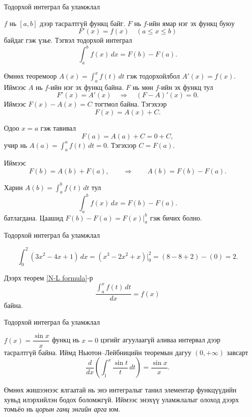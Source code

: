 \begin{frame}[allowframebreaks]{Тодорхой интеграл ба уламжлал}
\begin{theorem}\label{N-L formula}
$f$ нь $[a,b]$ дээр тасралтгүй функц байг. $F$ нь $f$-ийн ямар нэг эх функц буюу
\[
F'(x)=f(x)
\quad(a\le x\le b)
\]
байдаг гэж үзье. Тэгвэл тодорхой интеграл
\[
\int_a^b f(x)\,dx = F(b)-F(a).
\]
\end{theorem}

\begin{prof}
Өмнөх теоремоор $\displaystyle A(x)=\int_a^x f(t)\,dt$ гэж тодорхойлбол $A'(x)=f(x)$.
Иймээс $A$ нь $f$-ийн нэг эх функц байна. $F$ нь мөн $f$-ийн эх функц тул 
\[
F'(x)=A'(x)
\quad\Rightarrow\quad
(F-A)'(x)=0.
\]
Иймээс $F(x)-A(x)=C$ тогтмол байна. Тэгэхээр
\[
F(x)=A(x)+C.
\]

Одоо $x=a$ гэж тавивал
\[
F(a)=A(a)+C = 0 + C,
\]
учир нь $A(a)=\displaystyle\int_a^a f(t)\,dt =0$. Тэгэхээр $C=F(a)$.

Иймээс
\[
F(b)=A(b)+F(a),
\qquad\Rightarrow\qquad
A(b)=F(b)-F(a).
\]

Харин $A(b)=\displaystyle\int_a^b f(t)\,dt$ тул 
\[
\int_a^b f(x)\,dx = F(b)-F(a).
\] батлагдана. Цаашид $F(b)-F(a)=F(x)\Big|_a^b$ гэж бичих болно.
\end{prof}
\end{frame}

\begin{frame}[allowframebreaks]{Тодорхой интеграл ба уламжлал}
\begin{example}
\[
\int_0^2 (3x^2-4x+1)\,dx
=
\left(x^3-2x^2+x\right)\Big|_0^2
= (8-8+2)-(0)=2.
\]
\end{example}
Дээрх теорем \ref{N-L formula}-р $$\dfrac{\displaystyle\int_a^x f(t)\,dt}{dx}=f(x)$$ байна. 
\end{frame}

\begin{frame}[allowframebreaks]{Тодорхой интеграл ба уламжлал}
\begin{example}
$f(x)=\dfrac{\sin x}{x}$ функц нь $x=0$ цэгийг агуулаагүй аливаа интервал дээр тасралтгүй байна. Иймд Ньютон–Лейбницийн теоремын дагуу $(0,+\infty)$ завсарт
\[
\frac{d}{dx}\left(\int_{1}^{x} \frac{\sin t}{t}\,dt\right)=\frac{\sin x}{x}.
\]

Өмнөх жишээнээс ялгаатай нь энэ интегралыг танил элементар функцүүдийн хувьд илэрхийлэн бодох боломжгүй. Иймээс энэхүү уламжлалыг олоход дээрх томьёо нь \textit{цорын ганц энгийн арга} юм.
\end{example}
\end{frame}

